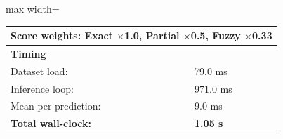 \begin{table}[htbp]
\begin{adjustbox}{max width=\textwidth}
\begin{tabular}{r p{5cm} r r r r}
\multicolumn{6}{l}{Score weights: Exact $\times$1.0, Partial $\times$0.5, Fuzzy $\times$0.33} \\
\midrule
\multicolumn{6}{l}{\textbf{Timing}} \\
\midrule
\multicolumn{3}{l}{Dataset load:} & \multicolumn{3}{l}{79.0 ms} \\
\multicolumn{3}{l}{Inference loop:} & \multicolumn{3}{l}{971.0 ms} \\
\multicolumn{3}{l}{Mean per prediction:} & \multicolumn{3}{l}{9.0 ms} \\
\multicolumn{3}{l}{\textbf{Total wall-clock:}} & \multicolumn{3}{l}{\textbf{1.05 s}} \\
\bottomrule
\end{tabular}
\end{adjustbox}
\end{table}
